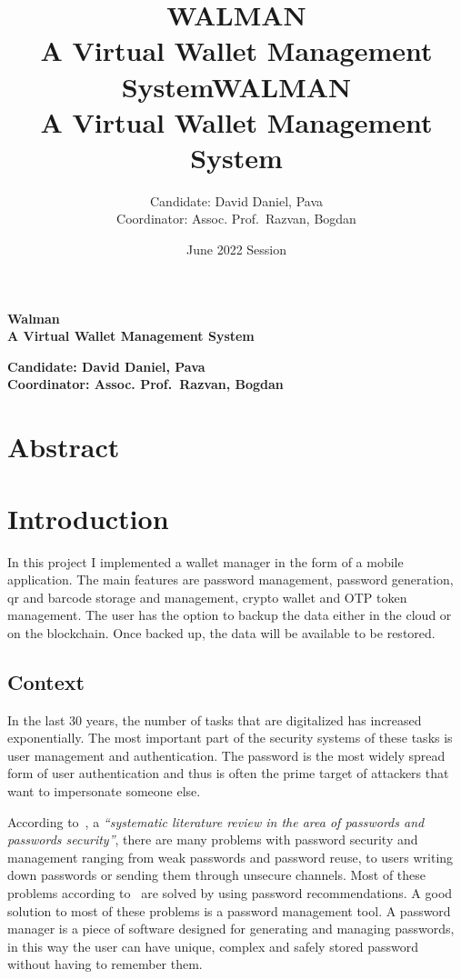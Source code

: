 \documentclass[a4paper,12pt]{report}
\title{\LARGE WALMAN\\{ A Virtual Wallet Management System}}
\title{\LARGE WALMAN\\{ A Virtual Wallet Management System}}
\author{Candidate: David Daniel, Pava
    \\Coordinator: Assoc. Prof.\ Razvan, Bogdan}
\date{June 2022 Session}
\begin{document}
\begin{titlepage}
    \thispagestyle{titlepage}
    \begin{center}
        \vspace*{10cm}
        \LARGE\textbf{Walman\\A Virtual Wallet Management System}\\
        \vfill
    \end{center}
    \begin{flushleft}
        \large\textbf{Candidate: David Daniel, Pava
            \\Coordinator: Assoc. Prof.\ Razvan, Bogdan}
    \end{flushleft}

\end{titlepage}

\chapter*{Abstract}

\tableofcontents

\chapter{Introduction}
In this project I implemented a wallet manager in the form of a mobile
application. The main features are password management, password generation, qr
and barcode storage and management, crypto wallet and OTP token management. The
user has the option to backup the data either in the cloud or on the
blockchain. Once backed up, the data will be available to be restored.

\section{Context}

\par In the last 30 years, the number of tasks that are digitalized has increased
exponentially. The most important part of the security systems of these tasks
is user management and authentication. The password is the most widely spread
form of user authentication and thus is often the prime target of attackers
that want to impersonate someone else.

According to~\cite{systematicAnalysis}, a \textit{``systematic literature
    review in the area of passwords and passwords security''}, there are many
problems with password security and management ranging from weak passwords and
password reuse, to users writing down passwords or sending them through
unsecure channels. Most of these problems according
to~\cite{systematicAnalysis} are solved by using password recommendations. A
good solution to most of these problems is a password management tool. A
password manager is a piece of software designed for generating and managing
passwords, in this way the user can have unique, complex and safely stored
password without having to remember them.
\end{document}
